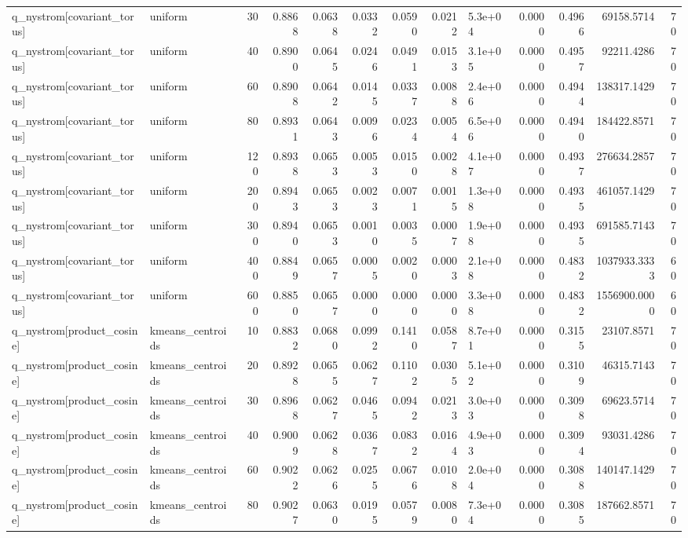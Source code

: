 \begin{table}
\begin{tabular}{llrrrrrrlrrrr}
q\_nystrom[covariant\_torus] & uniform & 30 & 0.8868 & 0.0638 & 0.0332 & 0.0590 & 0.0212 & 5.3e+04 & 0.0000 & 0.4966 & 69158.5714 & 70 \\
q\_nystrom[covariant\_torus] & uniform & 40 & 0.8900 & 0.0645 & 0.0246 & 0.0491 & 0.0153 & 3.1e+05 & 0.0000 & 0.4957 & 92211.4286 & 70 \\
q\_nystrom[covariant\_torus] & uniform & 60 & 0.8908 & 0.0642 & 0.0145 & 0.0337 & 0.0088 & 2.4e+06 & 0.0000 & 0.4944 & 138317.1429 & 70 \\
q\_nystrom[covariant\_torus] & uniform & 80 & 0.8931 & 0.0643 & 0.0096 & 0.0234 & 0.0054 & 6.5e+06 & 0.0000 & 0.4940 & 184422.8571 & 70 \\
q\_nystrom[covariant\_torus] & uniform & 120 & 0.8938 & 0.0653 & 0.0053 & 0.0150 & 0.0028 & 4.1e+07 & 0.0000 & 0.4937 & 276634.2857 & 70 \\
q\_nystrom[covariant\_torus] & uniform & 200 & 0.8943 & 0.0653 & 0.0023 & 0.0071 & 0.0015 & 1.3e+08 & 0.0000 & 0.4935 & 461057.1429 & 70 \\
q\_nystrom[covariant\_torus] & uniform & 300 & 0.8940 & 0.0653 & 0.0010 & 0.0035 & 0.0007 & 1.9e+08 & 0.0000 & 0.4935 & 691585.7143 & 70 \\
q\_nystrom[covariant\_torus] & uniform & 400 & 0.8849 & 0.0657 & 0.0005 & 0.0020 & 0.0003 & 2.1e+08 & 0.0000 & 0.4832 & 1037933.3333 & 60 \\
q\_nystrom[covariant\_torus] & uniform & 600 & 0.8850 & 0.0657 & 0.0000 & 0.0000 & 0.0000 & 3.3e+08 & 0.0000 & 0.4832 & 1556900.0000 & 60 \\
q\_nystrom[product\_cosine] & kmeans\_centroids & 10 & 0.8832 & 0.0680 & 0.0992 & 0.1410 & 0.0587 & 8.7e+01 & 0.0000 & 0.3155 & 23107.8571 & 70 \\
q\_nystrom[product\_cosine] & kmeans\_centroids & 20 & 0.8928 & 0.0655 & 0.0627 & 0.1102 & 0.0305 & 5.1e+02 & 0.0000 & 0.3109 & 46315.7143 & 70 \\
q\_nystrom[product\_cosine] & kmeans\_centroids & 30 & 0.8968 & 0.0627 & 0.0465 & 0.0942 & 0.0213 & 3.0e+03 & 0.0000 & 0.3098 & 69623.5714 & 70 \\
q\_nystrom[product\_cosine] & kmeans\_centroids & 40 & 0.9009 & 0.0628 & 0.0367 & 0.0832 & 0.0164 & 4.9e+03 & 0.0000 & 0.3094 & 93031.4286 & 70 \\
q\_nystrom[product\_cosine] & kmeans\_centroids & 60 & 0.9022 & 0.0626 & 0.0255 & 0.0676 & 0.0108 & 2.0e+04 & 0.0000 & 0.3088 & 140147.1429 & 70 \\
q\_nystrom[product\_cosine] & kmeans\_centroids & 80 & 0.9027 & 0.0630 & 0.0195 & 0.0579 & 0.0080 & 7.3e+04 & 0.0000 & 0.3085 & 187662.8571 & 70 \\

\end{tabular}
\end{table}
